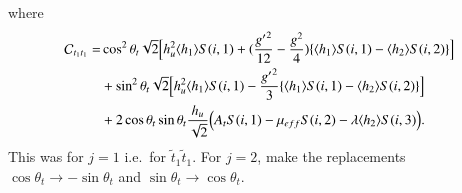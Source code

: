 \documentclass[final,3p,times,pdflatex]{elsarticle}
\begin{document}
where
\begin{equation}
\begin{aligned}
\mathcal{C}_{t_{1}t_{1}} = & \cos^2\theta_t \sqrt{2}\Big[h_{u}^2 \langle h_{1} \rangle S(i,1) + ({{g'}^{2} \over 12} - {g^2 \over 4})\{\langle h_{1} \rangle S(i,1) - \langle h_{2} \rangle S(i,2)\}\Big] \\ & + \sin^2 \theta_t \sqrt{2} \Big[h_{u}^2 \langle h_{1} \rangle S(i,1) - {{g'}^2 \over 3}\{\langle h_{1} \rangle S(i,1) - \langle h_{2} \rangle S(i,2)\}\Big] \\ & + 2\cos\theta_t \sin\theta_t {h_{u} \over \sqrt{2}}\Big(A_t S(i,1) - \mu_{eff} S(i,2) - \lambda \langle h_{2} \rangle S(i,3)\Big).
\end{aligned}
\end{equation}
This was for $j=1$ i.e.\ for $\tilde{t}_1 \tilde{t}_1$. For $j = 2$, make the replacements $\cos\theta_t \rightarrow -\sin\theta_t$ and $\sin\theta_t \rightarrow \cos\theta_t$.
\end{document}
